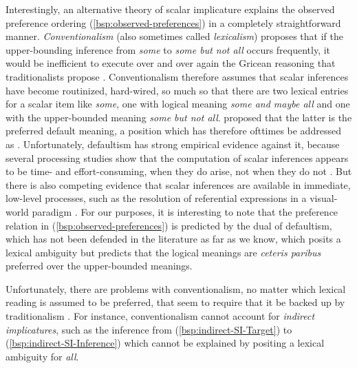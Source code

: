 \documentclass[fleqn,reqno,10pt,draft]{article}
\begin{document}
Interestingly, an alternative theory of scalar implicature explains
the observed preference ordering (\ref{bsp:observed-preferences}) in a
completely straightforward manner.  \emph{Conventionalism} (also
sometimes called \emph{lexicalism}) proposes that if the
upper-bounding inference from \emph{some} to \emph{some but not all}
occurs frequently, it would be inefficient to execute over and over
again the Gricean reasoning that traditionalists propose
\citep[e.g.][]{LevinsonPresumptiveMeanings2000,Chierchia:2004_ScalarImplicatures}. Conventionalism
therefore assumes that scalar inferences have become routinized,
hard-wired, so much so that there are two lexical entries for a scalar
item like \emph{some}, one with logical meaning \emph{some and maybe
  all} and one with the upper-bounded meaning \emph{some but not
  all}. \citet{LevinsonPresumptiveMeanings2000} proposed that the
latter is the preferred default meaning, a position which has
therefore ofttimes be addressed as . Unfortunately,
defaultism has strong empirical evidence against it, because several
processing studies show that the computation of scalar inferences
appears to be time- and effort-consuming, when they do arise, not when
they do not
\citep[c.f.][]{BrehenyKatsos2006:Are-Generalised,BrehenyKatsos2008:Experimental-In,NeysDe-NeysSchaeken2007:When-People-Are}. But
there is also competing evidence that scalar inferences are available
in immediate, low-level processes, such as the resolution of
referential expressions in a visual-world paradigm
\citep{GrodnerKlein2010:Some-and-Possib}. For our purposes, it is
interesting to note that the preference relation in
(\ref{bsp:observed-preferences}) is predicted by the dual of
defaultism, which has not been defended in the literature as far as we
know, which posits a lexical ambiguity but predicts that the logical
meanings are \emph{ceteris paribus} preferred over the upper-bounded
meanings.

Unfortunately, there are problems with conventionalism, no matter
which lexical reading is assumed to be preferred, that seem to require
that it be backed up by traditionalism
\citep[e.g.][]{Sauerland2012:The-Computation}.
For instance, conventionalism cannot account for \emph{indirect
  implicatures}, such as the inference from
(\ref{bsp:indirect-SI-Target}) to (\ref{bsp:indirect-SI-Inference})
which cannot be explained by positing a lexical ambiguity for
\emph{all}.
\end{document}

